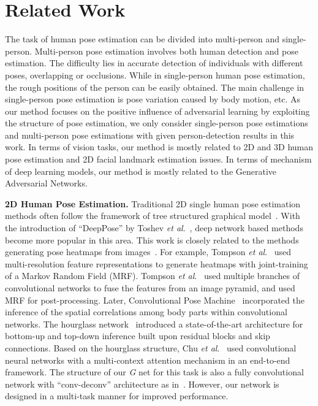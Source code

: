 \documentclass[10pt,journal,compsoc]{IEEEtran}
\begin{document}
\section{Related Work} \label{sec:Related-Work}
The task of human pose estimation can be divided into multi-person and single-person.
Multi-person pose estimation involves both human detection and pose estimation.
The difficulty lies in accurate detection of individuals with different poses, overlapping or occlusions.
While in single-person human pose estimation, the rough positions of the person can be easily obtained.
The main challenge in single-person pose estimation is pose variation caused by body motion, etc.
As our method focuses on the positive influence of adversarial learning by exploiting the structure of pose estimation, we only consider single-person pose estimations and multi-person pose estimations with given person-detection results in this work.
In terms of vision tasks, our method is mostly related to 2D and 3D human pose estimation and 2D facial landmark
estimation issues.
In terms of mechanism of deep learning models, our method is mostly related to the Generative
Adversarial Networks.

\textbf{2D Human Pose Estimation.}
Traditional 2D single human pose estimation methods often follow the framework of tree structured graphical model~\cite{journals/ijcv/EichnerMZF12,journals/ijcv/BuehlerEHZ11,conf/eccv/SappTT10,conf/cvpr/YangR11,conf/iccv/PishchulinAGS13,conf/cvpr/SappT13}.
With the introduction of ``DeepPose'' by Toshev \emph{et al}.~\cite{conf/cvpr/ToshevS14}, deep network based methods become more popular in this area.
This work is closely related to the methods generating pose heatmaps from images~\cite{conf/cvpr/YangOLW16,conf/eccv/NewellYD16,conf/cvpr/TompsonGJLB15,conf/cvpr/WeiRKS16,conf/cvpr/ChuOLW16,conf/cvpr/PishchulinITAAG16,conf/eccv/InsafutdinovPAA16,conf/nips/TompsonJLB14}.
For example, Tompson \emph{et al}.~\cite{conf/nips/TompsonJLB14} used multi-resolution feature representations to generate heatmaps with joint-training of a Markov Random Field (MRF).
Tompson \emph{et al}.~\cite{conf/cvpr/TompsonGJLB15} used multiple branches of convolutional networks to fuse the features from an image pyramid, and used MRF for post-processing.
Later, Convolutional Pose Machine~\cite{conf/cvpr/WeiRKS16} incorporated
 the inference of the spatial correlations among body parts within convolutional networks.
The hourglass network~\cite{conf/eccv/NewellYD16} introduced a state-of-the-art architecture for bottom-up and top-down inference built upon residual blocks and skip connections.
Based on the hourglass structure, Chu \emph{et al}.~\cite{chu2017multi}
 used convolutional neural networks with a multi-context attention mechanism in an end-to-end framework.
The structure of our \textit{G} net for this task is also a fully convolutional network with ``conv-deconv'' architecture as in~\cite{conf/eccv/NewellYD16}.
However, our network is designed in a multi-task manner for improved performance.
\end{document}
